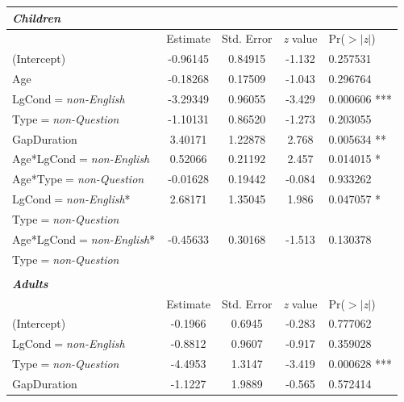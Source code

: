 \documentclass[authoryear, 12pt]{elsarticle}
\begin{document}
\linespread{1}
\begin{table}[h!]
\begin{small}
\begin{center}
  \begin{tabular}{lcccl}
  \textbf{\textit{Children}} &&&& \\
    \hline
			           &  Estimate & Std. Error & \textit{z} value & Pr($>$$|$\textit{z}$|$) \\    
    \hline
    (Intercept)   										& -0.96145	& 0.84915		& -1.132	& 0.257531 	\\    
    Age             										& -0.18268	& 0.17509		& -1.043	& 0.296764   	\\  
    LgCond$=$\textit{non-English} 			& -3.29349	& 0.96055		& -3.429	& 0.000606 *** 	\\
    Type$=$\textit{non-Question}      	& -1.10131	& 0.86520		& -1.273	& 0.203055     	\\
    GapDuration      										& 3.40171	& 1.22878		&  2.768	& 0.005634  **	\\
    Age*LgCond$=$\textit{non-English} 	& 0.52066	& 0.21192		&  2.457	& 0.014015 * 	\\  
    Age*Type$=$\textit{non-Question} 	& -0.01628	& 0.19442		& -0.084	& 0.933262     	\\
    LgCond$=$\textit{non-English}*			& 2.68171	& 1.35045		& 1.986	& 0.047057 * 	\\
    \hspace*{5mm} Type$=$\textit{non-Question} &&&& \\
    Age*LgCond$=$\textit{non-English}*	& -0.45633	& 0.30168		& -1.513	& 0.130378  \\
    \hspace*{5mm} Type$=$\textit{non-Question} &&&& \\
    \hline
  &&&& \\
  \textbf{\textit{Adults}} &&&& \\
    \hline
           &  Estimate & Std. Error & \textit{z} value & Pr($>$$|$\textit{z}$|$) \\    
    \hline
    (Intercept)												& -0.1966		& 0.6945		& -0.283	& 0.777062     	\\
    LgCond$=$\textit{non-English}				& -0.8812		& 0.9607		& -0.917	& 0.359028   	\\  
    Type$=$\textit{non-Question}				& -4.4953		& 1.3147		& -3.419	& 0.000628 *** \\
    GapDuration													& -1.1227		& 1.9889		& -0.565	& 0.572414     	\\

\end{tabular}
\end{center}
\end{small}
\end{table}
\end{document}
